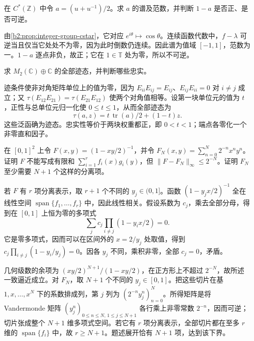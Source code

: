\begin{exercise}\label{b2:ex:D-integer-cosine}
	在 \(C^*(\mathbb Z)\) 中令 \(a=(u+u^{-1})/2\)。求 \(a\) 的谱及范数，并判断 \(1-a\) 是否正、是否可逆。
\end{exercise}
\begin{solution}
	由\cref{b2:prop:integer-group-cstar}，它对应 \(e^{i\theta}\mapsto\cos\theta\)。连续函数代数中，\(f-\lambda\) 可逆当且仅当它处处不为零，因为此时倒数仍连续。因此谱为值域 \([-1,1]\)，范数为一。\(1-a\) 逐点非负，故正；它在 \(1\in\mathbb T\) 处为零，所以不可逆。
\end{solution}

\begin{exercise}\label{b2:ex:D-direct-sum-traces}
	求 \(M_2(\mathbb C)\oplus\mathbb C\) 的全部迹态，并判断哪些忠实。
\end{exercise}
\begin{solution}
	迹条件使非对角矩阵单位上的值为零，因为 \(E_{ii}E_{ij}=E_{ij}\)、\(E_{ij}E_{ii}=0\) 对 \(i\ne j\) 成立；又 \(\tau(E_{12}E_{21})=\tau(E_{21}E_{12})\) 使两个对角值相等。设第一块单位元的值为 \(t\)，正性与总单位元归一化使 \(0\le t\le1\)，从而全部迹态为
	\[
		\tau(a,z)=t\,\operatorname{tr}(a)/2+(1-t)z.
	\]
	这些泛函确为迹态。忠实性等价于两块权重都正，即 \(0<t<1\)；端点各零化一个非零直和因子。
\end{solution}

\begin{exercise}\label{b2:ex:D-tensor-completion}
	在 \([0,1]^2\) 上令 \(F(x,y)=(1-xy/2)^{-1}\)，并令 \(F_N(x,y)=\sum_{n=0}^N2^{-n}x^ny^n\)。证明 \(F\) 不能写成有限和 \(\sum_{i=1}^r f_i(x)g_i(y)\)，但 \(\|F-F_N\|_\infty\le2^{-N}\)。证明 \(F_N\) 至少需要 \(N+1\) 个这样的分离项。
\end{exercise}
\begin{solution}
	若 \(F\) 有 \(r\) 项分离表示，取 \(r+1\) 个不同的 \(y_j\in(0,1]\)。函数 \((1-y_jx/2)^{-1}\) 全在线性空间 \(\operatorname{span}\{f_1,\ldots,f_r\}\) 中，因此线性相关。假设系数为 \(c_j\)，乘去全部分母，得到在 \([0,1]\) 上恒为零的多项式
	\[
		\sum_j c_j\prod_{i\ne j}(1-y_ix/2)=0.
	\]
	它是零多项式，因而可以在区间外的 \(x=2/y_j\) 处取值，得到 \(c_j\prod_{i\ne j}(1-y_i/y_j)=0\)。因各 \(y_j\) 不同，乘积非零，全部 \(c_j=0\)，矛盾。

	几何级数的余项为 \((xy/2)^{N+1}/(1-xy/2)\)，在正方形上不超过 \(2^{-N}\)，故所述一致逼近成立。对 \(F_N\)，取 \(N+1\) 个不同的 \(y_j\in[0,1]\)。把这些切片在基 \(1,x,\ldots,x^N\) 下的系数排成列，第 \(j\) 列为 \((2^{-n}y_j^n)_{n=0}^N\)。所得矩阵是将 Vandermonde 矩阵 \((y_j^n)_{0\le n\le N,\,1\le j\le N+1}\) 各行乘上非零常数 \(2^{-n}\)，因而可逆；切片张成整个 \(N+1\) 维多项式空间。若它有 \(r\) 项分离表示，全部切片都在至多 \(r\) 维的 \(\operatorname{span}\{f_i\}\) 中，故 \(r\ge N+1\)。题述展开恰有 \(N+1\) 项，达到该下界。
\end{solution}
